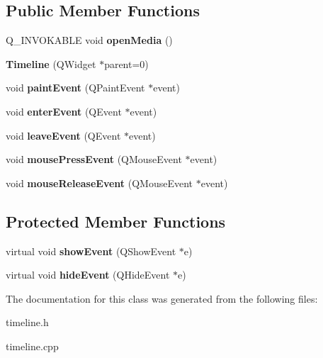 \subsection*{\-Public \-Member \-Functions}
\begin{DoxyCompactItemize}
\item 
\hypertarget{class_timeline_a0c8d0bbf652de8fcd63850ecd555e23f}{\-Q\-\_\-\-I\-N\-V\-O\-K\-A\-B\-L\-E void {\bfseries open\-Media} ()}\label{class_timeline_a0c8d0bbf652de8fcd63850ecd555e23f}

\item 
\hypertarget{class_timeline_a0429486feb6b2a1baac4cc89148c0137}{{\bfseries \-Timeline} (\-Q\-Widget $\ast$parent=0)}\label{class_timeline_a0429486feb6b2a1baac4cc89148c0137}

\item 
\hypertarget{class_timeline_abed70c7b27020b2f84cc0ba8ba0f413b}{void {\bfseries paint\-Event} (\-Q\-Paint\-Event $\ast$event)}\label{class_timeline_abed70c7b27020b2f84cc0ba8ba0f413b}

\item 
\hypertarget{class_timeline_a8f38f2ac8a0d14ecacddb6c0f2f313d2}{void {\bfseries enter\-Event} (\-Q\-Event $\ast$event)}\label{class_timeline_a8f38f2ac8a0d14ecacddb6c0f2f313d2}

\item 
\hypertarget{class_timeline_ae97432699e844cbc169f3afd0c89c53f}{void {\bfseries leave\-Event} (\-Q\-Event $\ast$event)}\label{class_timeline_ae97432699e844cbc169f3afd0c89c53f}

\item 
\hypertarget{class_timeline_a2c43c683af37dfaa70c973e61652e96b}{void {\bfseries mouse\-Press\-Event} (\-Q\-Mouse\-Event $\ast$event)}\label{class_timeline_a2c43c683af37dfaa70c973e61652e96b}

\item 
\hypertarget{class_timeline_ad18441ce861ff2141f72f9ce7e971bc9}{void {\bfseries mouse\-Release\-Event} (\-Q\-Mouse\-Event $\ast$event)}\label{class_timeline_ad18441ce861ff2141f72f9ce7e971bc9}

\end{DoxyCompactItemize}
\subsection*{\-Protected \-Member \-Functions}
\begin{DoxyCompactItemize}
\item 
\hypertarget{class_timeline_a6b59e99be70cbb493d4662d2ce82ffb5}{virtual void {\bfseries show\-Event} (\-Q\-Show\-Event $\ast$e)}\label{class_timeline_a6b59e99be70cbb493d4662d2ce82ffb5}

\item 
\hypertarget{class_timeline_adb03fad5868231059cef4eec5392b1bf}{virtual void {\bfseries hide\-Event} (\-Q\-Hide\-Event $\ast$e)}\label{class_timeline_adb03fad5868231059cef4eec5392b1bf}

\end{DoxyCompactItemize}


\-The documentation for this class was generated from the following files\-:\begin{DoxyCompactItemize}
\item 
timeline.\-h\item 
timeline.\-cpp\end{DoxyCompactItemize}

